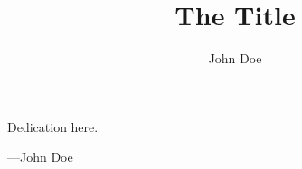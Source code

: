 \title{The Title}

\author{John Doe}





\begin{frontmatter}
\makefrontmatter


\begin{dedication}                                                             
Dedication here.
\end{dedication}                                                               
\clearpage 


\begin{myepigraph} %
  \vfil                                                                        
  \vfil 
\begin{centering}
\end{centering}
  \vfil 
  \vfil 
  \hfill ---John Doe
  \vfil 
\end{myepigraph}                                                               


\end{frontmatter}
